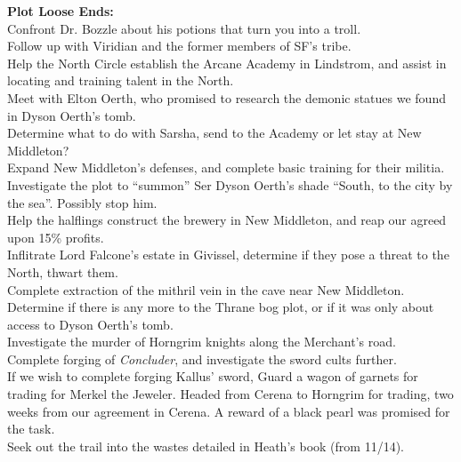 \documentclass[letterpaper]{article}
\begin{document}
\noindent \textbf{Plot Loose Ends:} \\
Confront Dr. Bozzle about his potions that turn you into a troll.\\
Follow up with Viridian and the former members of SF's tribe.\\
Help the North Circle establish the Arcane Academy in Lindstrom, and assist in locating and training talent in the North.\\
Meet with Elton Oerth, who promised to research the demonic statues we found in Dyson Oerth's tomb.\\
Determine what to do with Sarsha, send to the Academy or let stay at New Middleton?\\
Expand New Middleton's defenses, and complete basic training for their militia.\\
Investigate the plot to ``summon'' Ser Dyson Oerth's shade ``South, to the city by the sea''. Possibly stop him.\\
Help the halflings construct the brewery in New Middleton, and reap our agreed upon 15\% profits.\\
Inflitrate Lord Falcone's estate in Givissel, determine if they pose a threat to the North, thwart them.\\
Complete extraction of the mithril vein in the cave near New Middleton.\\
Determine if there is any more to the Thrane bog plot, or if it was only about access to Dyson Oerth's tomb.\\
Investigate the murder of Horngrim knights along the Merchant's road.\\
Complete forging of \emph{Concluder}, and investigate the sword cults further.\\
If we wish to complete forging Kallus' sword, Guard a wagon of garnets for trading for Merkel the Jeweler. Headed from Cerena to Horngrim for trading, two weeks from our agreement in Cerena. A reward of a black pearl was promised for the task.\\
Seek out the trail into the wastes detailed in Heath's book (from 11/14).\\
\end{document}
